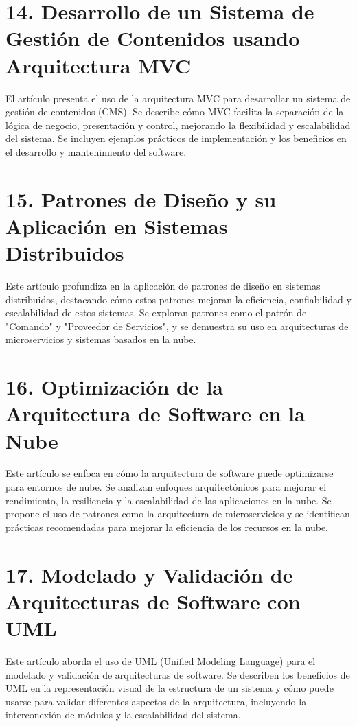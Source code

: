 \documentclass[twocolumn]{article}
\begin{document}
\printbibliography[heading=subbibliography]

\section*{14. Desarrollo de un Sistema de Gestión de Contenidos usando Arquitectura MVC}
El artículo presenta el uso de la arquitectura MVC para desarrollar un sistema de gestión de contenidos (CMS). Se describe cómo MVC facilita la separación de la lógica de negocio, presentación y control, mejorando la flexibilidad y escalabilidad del sistema. Se incluyen ejemplos prácticos de implementación y los beneficios en el desarrollo y mantenimiento del software.


\printbibliography[heading=subbibliography]

\section*{15. Patrones de Diseño y su Aplicación en Sistemas Distribuidos}
Este artículo profundiza en la aplicación de patrones de diseño en sistemas distribuidos, destacando cómo estos patrones mejoran la eficiencia, confiabilidad y escalabilidad de estos sistemas. Se exploran patrones como el patrón de "Comando" y "Proveedor de Servicios", y se demuestra su uso en arquitecturas de microservicios y sistemas basados en la nube.



\printbibliography[heading=subbibliography]

\section*{16. Optimización de la Arquitectura de Software en la Nube}
Este artículo se enfoca en cómo la arquitectura de software puede optimizarse para entornos de nube. Se analizan enfoques arquitectónicos para mejorar el rendimiento, la resiliencia y la escalabilidad de las aplicaciones en la nube. Se propone el uso de patrones como la arquitectura de microservicios y se identifican prácticas recomendadas para mejorar la eficiencia de los recursos en la nube.



\printbibliography[heading=subbibliography]

\section*{17. Modelado y Validación de Arquitecturas de Software con UML}
Este artículo aborda el uso de UML (Unified Modeling Language) para el modelado y validación de arquitecturas de software. Se describen los beneficios de UML en la representación visual de la estructura de un sistema y cómo puede usarse para validar diferentes aspectos de la arquitectura, incluyendo la interconexión de módulos y la escalabilidad del sistema.
\end{document}
